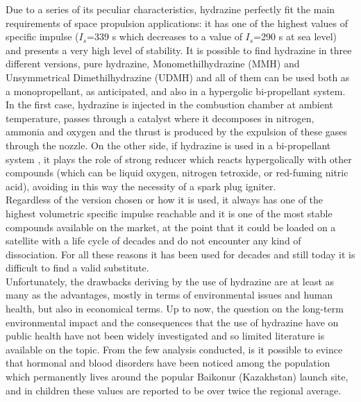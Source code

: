 \documentclass[a4paper]{report}
\begin{document}
Due to a series of its peculiar characteristics, hydrazine perfectly fit the main requirements of space propulsion applications: it has one of the highest values of specific impulse ($I_s$=339 s which decreases to a value of $I_s$=290 s at sea level) %
and presents a very high level of stability. It is possible to find hydrazine in three different versions, pure hydrazine, Monomethilhydrazine (MMH) and Unsymmetrical Dimethilhydrazine (UDMH) and all of them can be used both as a monopropellant, as anticipated, and also in a hypergolic bi-propellant system. In the first case, hydrazine is injected in the combustion chamber at ambient temperature, passes through a catalyst where it decomposes in nitrogen, ammonia and oxygen and the thrust is produced by the expulsion of these gases through the nozzle. On the other side, if hydrazine is used in a bi-propellant system , it plays the role of strong reducer which reacts hypergolically with other compounds (which can be liquid oxygen, nitrogen tetroxide, or red-fuming nitric acid), avoiding in this way the necessity of a spark plug igniter. \\ 
Regardless of the version chosen or how it is used, it always has one of the highest volumetric specific impulse reachable and it is one of the most stable compounds available on the market, at the point that it could be loaded on a satellite with a life cycle of decades and do not encounter any kind of dissociation. For all these reasons it has been used for decades and still today it is difficult to find a valid substitute. \\ %
Unfortunately, the drawbacks deriving by the use of hydrazine are at least as many as the advantages, mostly in terms of environmental issues and human health, but also in economical terms. Up to now, the question on the long-term environmental impact and the consequences that the use of hydrazine have on public health have not been widely investigated and so limited literature is available on the topic. From the few analysis conducted, is it possible to evince that hormonal and blood disorders have been noticed among the population which permanently lives around the popular Baikonur (Kazakhstan) launch site, and in children these values are reported to be over twice the regional average. %
\end{document}
